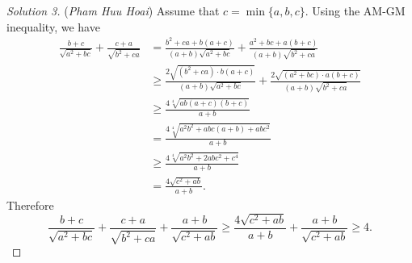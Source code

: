 \documentclass[12pt,a4paper]{book}
\begin{document}
\begin{proof}[\cmss\problemColor Solution 3]
(\textit{Pham Huu Hoai}) Assume that $c=\min\{a,b,c\}.$ Using the AM-GM inequality, we have
\[\begin{aligned}
\frac{b+c}{\sqrt{a^{2}+bc}} + \frac{c+a}{\sqrt{b^{2}+ca}} & =\frac{b^2+ca+b(a+c)}{(a+b)\sqrt{a^2+bc}}+\frac{a^2+bc+a(b+c)}{(a+b)\sqrt{b^2+ca}} \\
&\ge \frac{2\sqrt{(b^2+ca) \cdot b(a+c)}}{(a+b)\sqrt{a^2+bc}}+\frac{2\sqrt{(a^2+bc) \cdot a(b+c)}}{(a+b)\sqrt{b^2+ca}} \\
& \geqslant \frac{4\sqrt[4]{ab(a+c)(b+c)}}{a+b} \\
& = \frac{4\sqrt[4]{a^2b^2+abc(a+b)+abc^2}}{a+b} \\
& \ge \frac{4\sqrt[4]{a^2b^2+2abc^2+c^4}}{a+b} \\
& = \frac{4\sqrt{c^2+ab}}{a+b}.
\end{aligned}\]
Therefore
\[\frac{b+c}{\sqrt{a^{2}+bc}} + \frac{c+a}{\sqrt{b^{2}+ca}} + \frac{a+b}{\sqrt{c^{2}+ab}} \ge \frac{4\sqrt{c^2+ab}}{a+b}+\frac{a+b}{\sqrt{c^{2}+ab}} \ge 4.\]
\end{proof}
\end{document}
